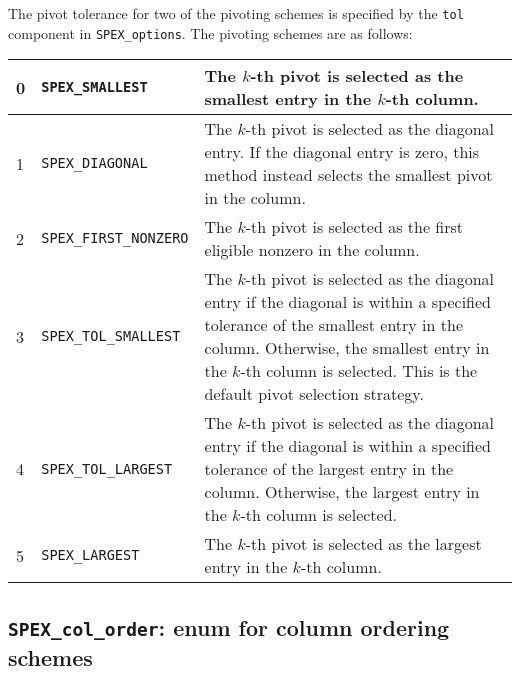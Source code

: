 \documentclass[12pt]{report}
\theoremstyle{definition}
\begin{document}
The pivot tolerance for two of the pivoting schemes is specified by the
\verb|tol| component in \verb|SPEX_options|.  The pivoting schemes are as
follows:

{\small
\begin{center}
\begin{tabular}{llp{4in}}
\hline
0 & \verb|SPEX_SMALLEST|        & The $k$-th pivot is selected as the smallest
                                  entry in the $k$-th column.\\
\hline
1 & \verb|SPEX_DIAGONAL|        & The $k$-th pivot is selected as the diagonal
                                  entry. If the diagonal entry is zero,
                                  this method instead selects the smallest
                                  pivot in the column.\\
\hline
2 & \verb|SPEX_FIRST_NONZERO|   & The $k$-th pivot is selected as the first
                                  eligible nonzero in the column. \\
\hline
3 & \verb|SPEX_TOL_SMALLEST|    & The $k$-th pivot is selected as the diagonal
                                  entry if the diagonal is within a
                                  specified tolerance of the smallest entry in
                                  the column. Otherwise, the smallest
                                  entry in the $k$-th column is selected.
                                  This is the default pivot selection
                                  strategy. \\
\hline
4 & \verb|SPEX_TOL_LARGEST|     & The $k$-th pivot is selected as the diagonal
                                  entry if the diagonal is within a
                                  specified tolerance of the largest entry in
                                  the column.  Otherwise, the largest
                                  entry in the $k$-th column is selected. \\
\hline
5 & \verb|SPEX_LARGEST|         & The $k$-th pivot is selected as the largest
                                  entry in the $k$-th column. \\
\hline
\end{tabular}
\end{center}
}

\cprotect\subsection{\verb|SPEX_col_order|: enum for column ordering schemes}
\label{ss:SPEX_col_order}
\end{document}
